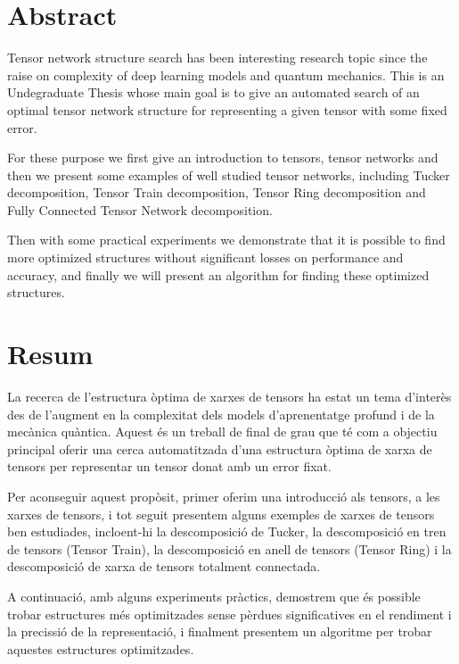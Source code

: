 \documentclass[11pt,a4paper,openright,oneside]{book}
\numberwithin{equation}{section}
\begin{document}
\newpage
{} 

\section*{Abstract}

Tensor network structure search has been interesting research topic since the raise on
complexity of deep learning models and quantum mechanics. This is an Undegraduate Thesis whose main goal is to give an 
automated search of an optimal tensor network structure for representing a given
tensor with some fixed error.

For these purpose we first give an introduction to tensors, tensor networks and then we present some examples
of well studied tensor networks, including Tucker decomposition, Tensor Train decomposition, Tensor Ring decomposition
and Fully Connected Tensor Network decomposition. 

Then with some practical experiments we demonstrate that it is possible to find more optimized structures
without significant losses on performance and accuracy, and finally we will present
an algorithm for finding these optimized structures.

\section*{Resum}

La recerca de l'estructura òptima de xarxes de tensors ha estat un tema d'interès des de l'augment en la complexitat dels models d'aprenentatge profund i de la mecànica quàntica. 
Aquest és un treball de final de grau que té com a objectiu principal oferir una cerca automatitzada 
d’una estructura òptima de xarxa de tensors per representar un tensor donat amb un error fixat.

Per aconseguir aquest propòsit, primer oferim una introducció als tensors, a les xarxes de tensors, i tot seguit presentem alguns exemples de xarxes de tensors ben estudiades, 
incloent-hi la descomposició de Tucker, la descomposició en tren de tensors (Tensor Train), la descomposició en anell
de tensors (Tensor Ring) i la descomposició de xarxa de tensors totalment connectada.

A continuació, amb alguns experiments pràctics, demostrem que és possible trobar estructures més optimitzades sense pèrdues significatives 
en el rendiment i la precissió de la representació, i finalment presentem un algoritme per trobar aquestes estructures optimitzades.
\end{document}
